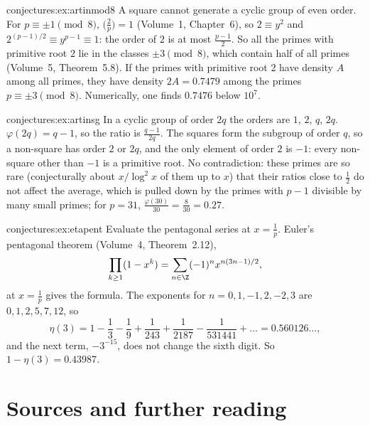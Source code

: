 \begin{solution}{conjectures:ex:artinmod8}
\idea A square cannot generate a cyclic group of even order.
\writeup For $p\equiv\pm1\pmod8$, $\bigl(\frac2p\bigr)=1$ (Volume~1, Chapter~6), so $2\equiv y^2$ and $2^{(p-1)/2}\equiv y^{p-1}\equiv1$: the order of $2$ is at most
$\frac{p-1}2$. So all the primes with primitive root $2$ lie in the classes $\pm3\pmod8$, which contain half of all primes (Volume~5, Theorem~5.8). If the
primes with primitive root $2$ have density $A$ among all primes, they have density $2A=0.7479$ among the primes $p\equiv\pm3\pmod8$. Numerically, one finds
$0.7476$ below $10^7$.
\end{solution}

\begin{solution}{conjectures:ex:artinsg}
\idea In a cyclic group of order $2q$ the orders are $1$, $2$, $q$, $2q$.
\writeup $\varphi(2q)=q-1$, so the ratio is $\frac{q-1}{2q}$. The squares form the subgroup of order $q$, so a non-square has order $2$ or $2q$, and the only
element of order $2$ is $-1$: every non-square other than $-1$ is a primitive root. No contradiction: these primes are so rare (conjecturally about
$x/\log^2x$ of them up to $x$) that their ratios close to $\frac12$ do not affect the average, which is pulled down by the primes with $p-1$ divisible by many
small primes; for $p=31$, $\frac{\varphi(30)}{30}=\frac8{30}=0.27$.
\end{solution}

\begin{solution}{conjectures:ex:etapent}
\idea Evaluate the pentagonal series at $x=\frac1p$.
\writeup Euler's pentagonal theorem (Volume~4, Theorem~2.12),
\[
\prod_{k\ge1}(1-x^k)=\sum_{n\in\Z}(-1)^nx^{n(3n-1)/2},
\]
at $x=\frac1p$ gives the formula. The exponents for
$n=0,1,-1,2,-2,3$ are $0,1,2,5,7,12$, so
\[
\eta(3)=1-\frac13-\frac19+\frac1{243}+\frac1{2187}-\frac1{531441}+\dots=0.560126\ldots,
\]
and the next term, $-3^{-15}$, does not change the sixth digit. So $1-\eta(3)=0.43987$.
\end{solution}

\section*{Sources and further reading}

